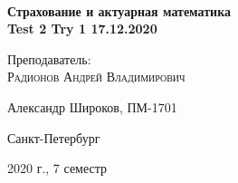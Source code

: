 \documentclass[%
12pt, %
final, %
oneside, %
onecolumn, %
centertags]{article} %
\theoremstyle{plain}
\theoremstyle{definition}
\theoremstyle{remark}
\begin{document}
\begin{titlepage} 
\begin{center}
\textbf{}\\[10.0cm]
\textbf{\LARGE Страхование и актуарная математика}\\[0.5cm]
\textbf{\Large Test 2 Try 1 17.12.2020} \\[0.2cm]


\begin{center} \large
{Преподаватель:} \\[0.5cm]
\textsc {Радионов Андрей Владимирович}\\
\end{center}

\vfill 



{\large {Александр Широков, ПМ-1701}} \par
{\large {Санкт-Петербург}} \par
{\large {2020 г., 7 семестр}} 

\end{center} 
\end{titlepage}

\newpage
\end{document}
